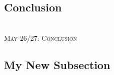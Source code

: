 \documentclass[11pt]{article}
\begin{document}
\vspace{2mm}
\subsection*{Conclusion}

~\\
\noindent \textsc{May 26/27: Conclusion} \\

\vspace{2mm}
\subsection*{My New Subsection}
\end{document}
